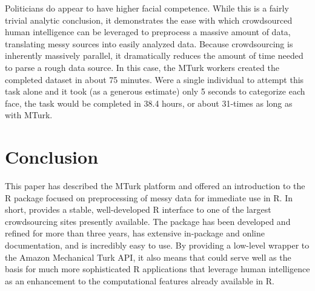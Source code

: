 Politicians do appear to have higher facial competence. While this is
a fairly trivial analytic conclusion, it demonstrates the ease with
which crowdsourced human intelligence can be leveraged to preprocess a
massive amount of data, translating messy sources into easily analyzed
data. Because crowdsourcing is inherently massively parallel, it
dramatically reduces the amount of time needed to parse a rough data
source. In this case, the MTurk workers created the completed dataset
in about 75 minutes. Were a single individual to attempt this task
alone and it took (as a generous estimate) only 5 seconds to
categorize each face, the task would be completed in 38.4 hours, or
about 31-times as long as with MTurk.

\section{Conclusion}

This paper has described the MTurk platform and offered an
introduction to the R package  focused on preprocessing of
messy data for immediate use in R. In short,  provides a
stable, well-developed R interface to one of the largest crowdsourcing
sites presently available. The package has been developed and refined
for more than three years, has extensive in-package and online
documentation, and is incredibly easy to use. By providing a low-level
wrapper to the Amazon Mechanical Turk API, it also means that
 could serve well as the basis for much more sophisticated
R applications that leverage human intelligence as an enhancement to
the computational features already available in R.



\address{Thomas J. Leeper\\
Department of Government\\
London School of Economics and Political Science\\
London, United Kingdom}\\
